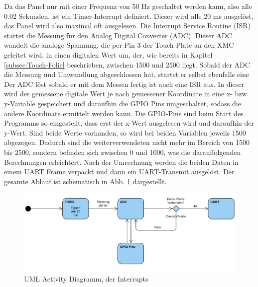 \documentclass[12pt,a4paper,bibliography=totoc,listof=totoc]{scrartcl}
\begin{document}
Da das Panel nur mit einer Frequenz von 50 Hz geschaltet werden kann, also alle 0.02 Sekunden, ist ein Timer-Interrupt definiert. Dieser wird alle 20 ms ausgelöst, das Panel wird also maximal oft ausgelesen. Die Interrupt Service Routine (ISR) startet die Messung für den Analog Digital Converter (ADC). Dieser ADC wandelt die analoge Spannung, die per Pin 3 der Touch Plate an den XMC geleitet wird, in einen digitalen Wert um, der, wie bereits in Kapitel \ref{subsec:Touch-Folie} beschrieben, zwischen 1500 und 2500 liegt. Sobald der ADC die Messung und Umwandlung abgeschlossen hat, startet er selbst ebenfalls eine 
Der ADC löst sobald er mit dem Messen fertig ist auch eine ISR aus. In dieser wird der gemessene digitale Wert je nach gemessener Koordinate in eine x- bzw. y-Variable gespeichert und daraufhin die GPIO Pins umgeschaltet, sodass die andere Koordinate ermittelt werden kann.
Die GPIO-Pins sind beim Start des Programms so eingestellt, dass erst der x-Wert ausgelesen wird und daraufhin der y-Wert. Sind beide Werte vorhanden, so wird bei beiden Variablen jeweils 1500 abgezogen. Dadurch sind die weiterverwendeten nicht mehr im Bereich von 1500 bis 2500, sondern befinden sich zwischen 0 und 1000, was die darauffolgenden Berechnungen erleichtert. Nach der Umrechnung werden die beiden Daten in einem UART Frame verpackt und dann ein UART-Transmit ausgelöst.
Der gesamte Ablauf ist schematisch in Abb. \ref{fig:TouchUML} dargestellt.

\begin{figure}[htbp]
	\centering
	\includegraphics[scale = 0.6]{pics/TouchUML.png}
	\caption{UML Activity Diagramm, der Interrupts}
	\label{fig:TouchUML}
\end{figure}
\end{document}
